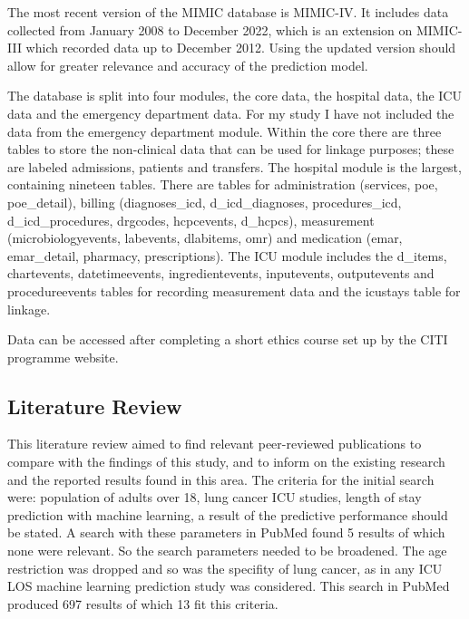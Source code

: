 \documentclass[11pt]{article}
\begin{document}
The most recent version of the MIMIC database is MIMIC-IV. It includes data collected from January 2008 to December 2022, which is an extension on MIMIC-III which recorded data up to December 2012. Using the updated version should allow for greater relevance and accuracy of the prediction model.

The database is split into four modules, the core data, the hospital data, the ICU data and the emergency department data. For my study I have not included the data from the emergency department module. Within the core there are three tables to store the non-clinical data that can be used for linkage purposes; these are labeled admissions, patients and transfers. The hospital module is the largest, containing nineteen tables. There are tables for administration (services, poe, poe\_detail), billing (diagnoses\_icd, d\_icd\_diagnoses, procedures\_icd, d\_icd\_procedures, drgcodes, hcpcevents, d\_hcpcs), measurement (microbiologyevents, labevents, d\-labitems, omr) and medication (emar, emar\_detail, pharmacy, prescriptions). The ICU module includes the d\_items, chartevents, datetimeevents, ingredientevents, inputevents, outputevents and procedureevents tables for recording measurement data and the icustays table for linkage.


Data can be accessed after completing a short ethics course set up by the CITI programme website\cite{physionetCITICourse}\cite{citiprogramTechEthics}.

\subsection{Literature Review}

This literature review aimed to find relevant peer-reviewed publications to compare with the findings of this study, and to inform on the existing research and the reported results found in this area. The criteria for the initial search were: population of adults over 18, lung cancer ICU studies, length of stay prediction with machine learning, a result of the predictive performance should be stated.  A search with these parameters in PubMed found 5 results of which none were relevant. So the search parameters needed to be broadened. The age restriction was dropped and so was the specifity of lung cancer, as in any ICU LOS machine learning prediction study was considered. This search in PubMed produced 697 results of which 13 fit this criteria.
\end{document}
